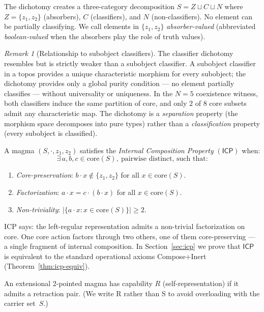 \documentclass[sigconf,screen,review,anonymous]{acmart}
\newcommand{\dotop}{\cdot}
\newcommand{\ICP}{\textsf{ICP}}
\newcommand{\core}{\mathrm{core}}
\theoremstyle{remark}
\newtheorem{remark}{Remark}
\begin{document}
The dichotomy creates a three-category decomposition $S = Z \sqcup C \sqcup N$ where $Z = \{z_1, z_2\}$ (absorbers), $C$ (classifiers), and $N$ (non-classifiers). No element can be partially classifying. We call elements in $\{z_1, z_2\}$ \emph{absorber-valued} (abbreviated \emph{boolean-valued} when the absorbers play the role of truth values).

\begin{remark}[Relationship to subobject classifiers]
\label{rem:subobj}
The classifier dichotomy resembles but is strictly weaker than a subobject classifier. A subobject classifier in a topos provides a unique characteristic morphism for every subobject; the dichotomy provides only a global purity condition --- no element partially classifies --- without universality or uniqueness. In the $N\!=\!5$ coexistence witness, both classifiers induce the same partition of core, and only $2$ of $8$ core subsets admit any characteristic map. The dichotomy is a \emph{separation} property (the morphism space decomposes into pure types) rather than a \emph{classification} property (every subobject is classified).
\end{remark}

\begin{definition}
\label{def:icp}
A magma $(S, \dotop, z_1, z_2)$ satisfies the \emph{Internal Composition Property} $(\ICP)$ when:
\[
\exists\, a, b, c \in \core(S),\ \text{pairwise distinct, such that:}
\]
\begin{enumerate}
  \item \emph{Core-preservation}: $b \dotop x \notin \{z_1, z_2\}$ for all $x \in \core(S)$.
  \item \emph{Factorization}: $a \dotop x = c \dotop (b \dotop x)$ for all $x \in \core(S)$.
  \item \emph{Non-triviality}: $|\{a \dotop x : x \in \core(S)\}| \geq 2$.
\end{enumerate}
\end{definition}

ICP says: the left-regular representation admits a non-trivial factorization on core. One core action factors through two others, one of them core-preserving --- a single fragment of internal composition. In Section~\ref{sec:icp} we prove that $\ICP$ is equivalent to the standard operational axioms Compose+Inert (Theorem~\ref{thm:icp-equiv}).

\begin{definition}[Capability R]
An extensional 2-pointed magma has capability $R$ (self-representation) if it admits a retraction pair. (We write R rather than S to avoid overloading with the carrier set~$S$.)
\end{definition}
\end{document}
